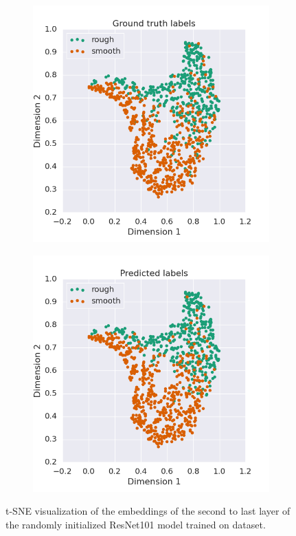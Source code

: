 \documentclass{aci}
\numberwithin{equation}{section}
\begin{document}
\begin{figure}[h!]
    \centering
    \begin{subfigure}{.45\textwidth}
        \includegraphics[width=1\linewidth]{thesis_assets/plots/resnet101_gt_tsne.png}
    \end{subfigure}
    \begin{subfigure}{.45\textwidth}
        \includegraphics[width=1\linewidth]{thesis_assets/plots/resnet101_pred_tsne.png}
    \end{subfigure}
    \caption{t-SNE visualization of the embeddings of the second to last layer
        of the randomly initialized ResNet101 model trained on dataset.}
    \label{fig:resnet101_tsne}
\end{figure}
\end{document}

